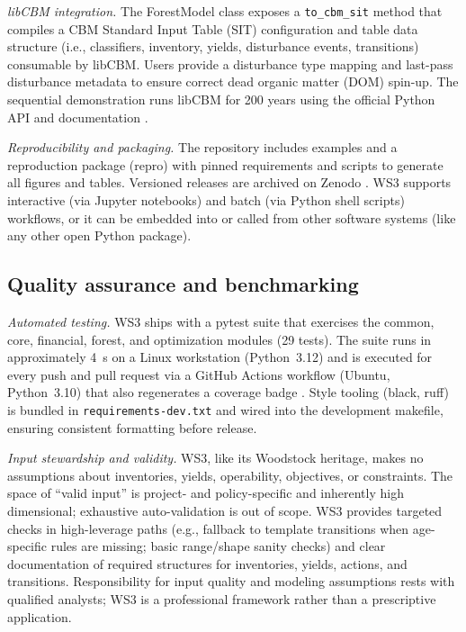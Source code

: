 \documentclass[review]{elsarticle}
\begin{document}
\emph{libCBM integration.} The ForestModel class exposes a \texttt{to\_cbm\_sit} method that compiles a CBM Standard Input Table (SIT) configuration and table data structure (i.e., classifiers, inventory, yields, disturbance events, transitions) consumable by libCBM. Users provide a disturbance type mapping and last-pass disturbance metadata to ensure correct dead organic matter (DOM) spin-up. The sequential demonstration runs libCBM for 200 years using the official Python API and documentation \citep{libcbm_py_docs, libcbm_py_repo}.

\emph{Reproducibility and packaging.} The repository includes examples and a reproduction package (repro) with pinned requirements and scripts to generate all figures and tables. Versioned releases are archived on Zenodo \citep{ws3_zenodo2025}. WS3 supports interactive (via Jupyter notebooks) and batch (via Python shell scripts) workflows, or it can be embedded into or called from other software systems (like any other open Python package).

\subsection{Quality assurance and benchmarking}
\emph{Automated testing.} WS3 ships with a pytest suite that exercises the common, core, financial, forest, and optimization modules (29 tests). The suite runs in approximately 4~s on a Linux workstation (Python~3.12) and is executed for every push and pull request via a GitHub Actions workflow (Ubuntu, Python~3.10) that also regenerates a coverage badge \citep{ci_workflow}. Style tooling (black, ruff) is bundled in \texttt{requirements-dev.txt} and wired into the development makefile, ensuring consistent formatting before release.

\emph{Input stewardship and validity.} WS3, like its Woodstock heritage, makes no assumptions about inventories, yields, operability, objectives, or constraints. The space of ``valid input'' is project- and policy-specific and inherently high dimensional; exhaustive auto-validation is out of scope. WS3 provides targeted checks in high-leverage paths (e.g., fallback to template transitions when age-specific rules are missing; basic range/shape sanity checks) and clear documentation of required structures for inventories, yields, actions, and transitions. Responsibility for input quality and modeling assumptions rests with qualified analysts; WS3 is a professional framework rather than a prescriptive application.
\end{document}
